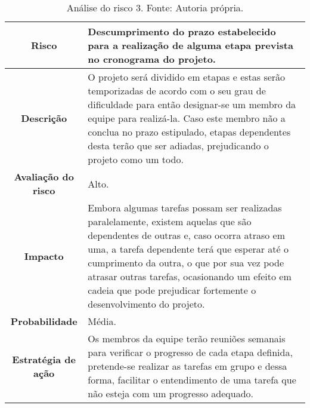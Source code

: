 \begin{table}[h!]
\caption[Análise do risco 3]{Análise do risco 3. Fonte: Autoria própria.}
\begin{center}
\begin{tabular}{|c|p{11cm}|}
\hline
\textbf{Risco} & Descumprimento do prazo estabelecido para a realização de alguma etapa prevista no cronograma do projeto. \\
\hline
\textbf{Descrição} & O projeto será dividido em etapas e estas serão temporizadas de acordo com o seu grau de dificuldade para então designar-se um membro da equipe para realizá-la. Caso este membro não a conclua no prazo estipulado, etapas dependentes desta terão que ser adiadas, prejudicando o projeto como um todo.\\
\hline
\textbf{Avaliação do risco} & Alto. \\
\hline
\textbf{Impacto} & Embora algumas tarefas possam ser realizadas paralelamente, existem aquelas que são dependentes de outras e, caso ocorra atraso em uma, a tarefa dependente terá que esperar até o cumprimento da outra, o que por sua vez pode atrasar outras tarefas, ocasionando um efeito em cadeia que pode prejudicar fortemente o desenvolvimento do projeto. \\ 
\hline
\textbf{Probabilidade} & Média.\\
\hline
\textbf{Estratégia de ação} &  Os membros da equipe terão reuniões semanais para verificar o progresso de cada etapa definida, pretende-se realizar as tarefas em grupo e dessa forma, facilitar o entendimento de uma tarefa que não esteja com um progresso adequado.	\\
\hline
\end{tabular}%
\end{center}
\label{tab:risco1}
\end{table}

